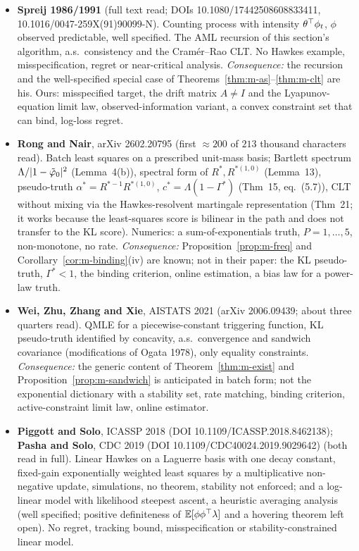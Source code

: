 \begin{itemize}[nosep]
\item \textbf{Spreij 1986/1991} (full text read; DOIs 10.1080/17442508608833411, 10.1016/0047-259X(91)90099-N). Counting process with intensity $\theta^{\top}\phi_t$, $\phi$ observed predictable, well specified. The AML recursion of this section's algorithm, a.s.\ consistency and the Cram\'er--Rao CLT. No Hawkes example, misspecification, regret or near-critical analysis. \emph{Consequence:} the recursion and the well-specified special case of Theorems~\ref{thm:m-as}--\ref{thm:m-clt} are his. Ours: misspecified target, the drift matrix $A\ne I$ and the Lyapunov-equation limit law, observed-information variant, a convex constraint set that can bind, log-loss regret.
\item \textbf{Rong and Nair}, arXiv 2602.20795 (first $\approx200$ of $213$ thousand characters read). Batch least squares on a prescribed unit-mass basis; Bartlett spectrum $\Lambda/\lvert 1-\tilde\varphi_0\rvert^2$ (Lemma~4(b)), spectral form of $R^*,R^{*(1,0)}$ (Lemma~13), pseudo-truth $\alpha^*=R^{*-1}R^{*(1,0)}$, $c^*=\Lambda(1-\Gamma^*)$ (Thm~15, eq.~(5.7)), CLT without mixing via the Hawkes-resolvent martingale representation (Thm~21; it works because the least-squares score is bilinear in the path and does not transfer to the KL score). Numerics: a sum-of-exponentials truth, $P=1,\dots,5$, non-monotone, no rate. \emph{Consequence:} Proposition~\ref{prop:m-freq} and Corollary~\ref{cor:m-binding}(iv) are known; not in their paper: the KL pseudo-truth, $\Gamma^*<1$, the binding criterion, online estimation, a bias law for a power-law truth.
\item \textbf{Wei, Zhu, Zhang and Xie}, AISTATS 2021 (arXiv 2006.09439; about three quarters read). QMLE for a piecewise-constant triggering function, KL pseudo-truth identified by concavity, a.s.\ convergence and sandwich covariance (modifications of Ogata 1978), only equality constraints. \emph{Consequence:} the generic content of Theorem~\ref{thm:m-exist} and Proposition~\ref{prop:m-sandwich} is anticipated in batch form; not the exponential dictionary with a stability set, rate matching, binding criterion, active-constraint limit law, online estimator.
\item \textbf{Piggott and Solo}, ICASSP 2018 (DOI 10.1109/ICASSP.2018.8462138); \textbf{Pasha and Solo}, CDC 2019 (DOI 10.1109/CDC40024.2019.9029642) (both read in full). Linear Hawkes on a Laguerre basis with one decay constant, fixed-gain exponentially weighted least squares by a multiplicative non-negative update, simulations, no theorem, stability not enforced; and a log-linear model with likelihood steepest ascent, a heuristic averaging analysis (well specified; positive definiteness of $\mathbb{E}[\phi\phi^{\top}\lambda]$ and a hovering theorem left open). No regret, tracking bound, misspecification or stability-constrained linear model.

\end{itemize}

